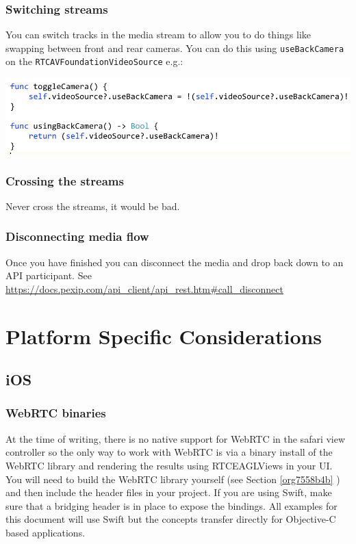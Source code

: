\documentclass[a4paper,11pt]{article}
\begin{document}
\subsubsection{Switching streams}
\label{sec:org19ec535}

You can switch tracks in the media stream to allow you to do things
like swapping between front and rear cameras.  You can do this using
\texttt{useBackCamera} on the \texttt{RTCAVFoundationVideoSource} e.g.:

\begin{center}
\includegraphics[width=.9\linewidth]{./images/toggle_camera.png}
\end{center}

\subsubsection{Crossing the streams}
\label{sec:orgaf146f8}

Never cross the streams, it would be bad.

\subsubsection{Disconnecting media flow}
\label{sec:orgfc2560e}

Once you have finished you can disconnect the media and drop back down
to an API participant.  See
\url{https://docs.pexip.com/api\_client/api\_rest.htm\#call\_disconnect}

\section{Platform Specific Considerations}
\label{sec:orgb3cfb24}
\subsection{iOS}
\label{sec:org98ea06c}
\subsubsection{WebRTC binaries}
\label{sec:org06d8d11}

At the time of writing, there is no native support for WebRTC in the
safari view controller so the only way to work with WebRTC is via a
binary install of the WebRTC library and rendering the results
using RTCEAGLViews in your UI.  You will need to build the WebRTC
library yourself (see Section \ref{org7558b4b} ) and then include the
header files in your project.  If you are using Swift, make sure that
a bridging header is in place to expose the bindings.  All examples
for this document will use Swift but the concepts transfer directly
for Objective-C based applications.
\end{document}
